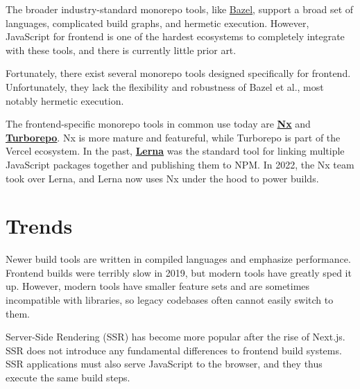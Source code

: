 \documentclass{article}
\newcommand{\tb}{\textbf}
\begin{document}
The broader industry-standard monorepo tools, like  \href{https://bazel.build/}{Bazel}, support a
broad set of languages, complicated build graphs, and hermetic execution. However, JavaScript for
frontend is one of the hardest ecosystems to completely integrate with these tools, and there is
currently little prior art.

Fortunately, there exist several monorepo tools designed specifically for frontend. Unfortunately,
they lack the flexibility and robustness of Bazel et al., most notably hermetic execution.

The frontend-specific monorepo tools in common use today are \href{https://nx.dev/}{\tb{Nx}} and
\href{https://turbo.build/repo}{\tb{Turborepo}}. Nx is more mature and featureful, while Turborepo
is part of the Vercel ecosystem. In the past, \href{https://lerna.js.org/}{\tb{Lerna}} was the
standard tool for linking multiple JavaScript packages together and publishing them to NPM. In 2022,
the Nx team took over Lerna, and Lerna now uses Nx under the hood to power builds.

\section{Trends}

Newer build tools are written in compiled languages and emphasize performance. Frontend builds were
terribly slow in 2019, but modern tools have greatly sped it up. However, modern tools have smaller
feature sets and are sometimes incompatible with libraries, so legacy codebases often cannot easily
switch to them.

Server-Side Rendering (SSR) has become more popular after the rise of Next.js. SSR does not
introduce any fundamental differences to frontend build systems. SSR applications must also serve
JavaScript to the browser, and they thus execute the same build steps.
\end{document}
